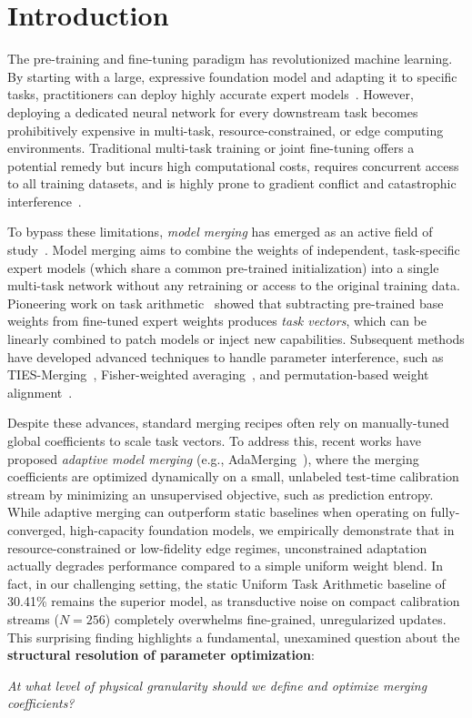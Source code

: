 \section{Introduction}
\label{sec:intro}

The pre-training and fine-tuning paradigm has revolutionized machine learning. 
By starting with a large, expressive foundation model and adapting it to specific tasks, practitioners can deploy highly accurate expert models~\cite{radford2021learning,devlin2018bert}. 
However, deploying a dedicated neural network for every downstream task becomes prohibitively expensive in multi-task, resource-constrained, or edge computing environments. 
Traditional multi-task training or joint fine-tuning offers a potential remedy but incurs high computational costs, requires concurrent access to all training datasets, and is highly prone to gradient conflict and catastrophic interference~\cite{french1999catastrophic,mccloskey1989catastrophic}.

To bypass these limitations, \emph{model merging} has emerged as an active field of study~\cite{seneviratne2024survey,choshen2022fusing}. 
Model merging aims to combine the weights of independent, task-specific expert models (which share a common pre-trained initialization) into a single multi-task network without any retraining or access to the original training data. 
Pioneering work on task arithmetic~\cite{ilharco2022task} showed that subtracting pre-trained base weights from fine-tuned expert weights produces \emph{task vectors}, which can be linearly combined to patch models or inject new capabilities. 
Subsequent methods have developed advanced techniques to handle parameter interference, such as TIES-Merging~\cite{yadav2023ties}, Fisher-weighted averaging~\cite{matena2022merging}, and permutation-based weight alignment~\cite{ainsworth2023git,zhang2023zipit}.

Despite these advances, standard merging recipes often rely on manually-tuned global coefficients to scale task vectors. 
To address this, recent works have proposed \emph{adaptive model merging} (e.g., AdaMerging~\cite{yang2024adamerging}), where the merging coefficients are optimized dynamically on a small, unlabeled test-time calibration stream by minimizing an unsupervised objective, such as prediction entropy. 
While adaptive merging can outperform static baselines when operating on fully-converged, high-capacity foundation models, we empirically demonstrate that in resource-constrained or low-fidelity edge regimes, unconstrained adaptation actually degrades performance compared to a simple uniform weight blend. In fact, in our challenging setting, the static Uniform Task Arithmetic baseline of 30.41\% remains the superior model, as transductive noise on compact calibration streams ($N=256$) completely overwhelms fine-grained, unregularized updates. This surprising finding highlights a fundamental, unexamined question about the \textbf{structural resolution of parameter optimization}:
\begin{center}
\emph{At what level of physical granularity should we define and optimize merging coefficients?}
\end{center}

